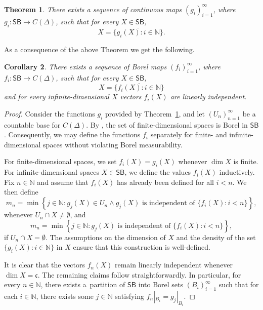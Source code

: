 \documentclass[12pt,fleqn]{amsart}
\newtheorem{theorem}{Theorem}[section]
\newtheorem{corollary}[theorem]{Corollary}
\theoremstyle{definition}
\theoremstyle{remark}
\begin{document}
\begin{theorem}\label{thm:continuous_selections}
There exists a sequence of continuous maps \((g_i)_{i=1}^\infty\), where \(g_i \colon \mathsf{SB} \to C(\Delta)\), such that for every \(X \in \mathsf{SB}\),
\[
    X = \overline{\{g_i(X)\colon i \in \mathbb{N}\}}.
\]
\end{theorem}
As a consequence of the above Theorem we get the following.
\begin{corollary}\label{cor:borel_selections}
    There exists a sequence of Borel maps \((f_i)_{i=1}^\infty\), where \(f_i \colon \mathsf{SB} \to C(\Delta)\), such that for every \(X \in \mathsf{SB}\),
\[
    X = \overline{\{f_i(X)\colon i \in \mathbb{N}\}}
\] and for every infinite-dimensional $X$ vectors $f_i(X)$ are linearly independent.
\end{corollary}
\begin{proof}
    Consider the functions $g_i$ provided by Theorem~\ref{thm:continuous_selections}, and let $(U_n)_{n=1}^\infty$ be a countable base for $C(\Delta)$. By \cite[Corollary 4.2]{GoSR}, the set of finite-dimensional spaces is Borel in $\mathsf{SB}$. Consequently, we may define the functions $f_i$ separately for finite- and infinite-dimensional spaces without violating Borel measurability.

    For finite-dimensional spaces, we set $f_i(X) = g_i(X)$ whenever $\dim X$ is finite. For infinite-dimensional spaces $X \in \mathsf{SB}$, we define the values $f_i(X)$ inductively. Fix $n \in \mathbb{N}$ and assume that $f_i(X)$ has already been defined for all $i < n$. We then define 
    \[
        m_n = \min \left\{ j \in \mathbb{N} \colon g_j(X) \in U_n \wedge g_j(X) \text{ is independent of } \{ f_i(X) \colon i < n \} \right\},
    \]
    whenever $U_n \cap X \neq \emptyset$, and
    \[
        m_n = \min \left\{ j \in \mathbb{N} \colon g_j(X) \text{ is independent of } \{ f_i(X) \colon i < n \} \right\},
    \]
    if $U_n \cap X = \emptyset$. The assumptions on the dimension of $X$ and the density of the set $\{ g_i(X) \colon i \in \mathbb{N} \}$ in $X$ ensure that this construction is well-defined.

    It is clear that the vectors $f_n(X)$ remain linearly independent whenever $\dim X = \mathfrak{c}$. The remaining claims follow straightforwardly. In particular, for every $n \in \mathbb{N}$, there exists a~partition of $\mathsf{SB}$ into Borel sets $(B_i)_{i=1}^\infty$ such that for each $i \in \mathbb{N}$, there exists some $j \in \mathbb{N}$ satisfying $f_n |_{B_i} = g_j |_{B_i}$.
\end{proof}
 
\end{document}
